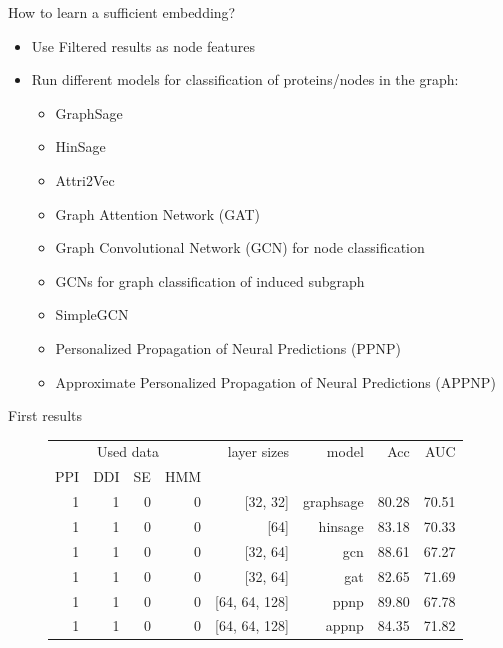 \documentclass[10pt]{beamer}
\begin{document}
\begin{frame}{How to learn a sufficient embedding?}
	\begin{itemize}
		\item Use Filtered results as node features
		\item Run different models for classification of proteins/nodes in the graph:
		\begin{itemize}
			\item GraphSage
			\item HinSage
			\item Attri2Vec
			\item Graph Attention Network (GAT)
			\item Graph Convolutional Network (GCN) for node classification
			\item GCNs for graph classification of induced subgraph
			\item SimpleGCN
			\item Personalized Propagation of Neural Predictions (PPNP)
			\item Approximate Personalized Propagation of Neural Predictions (APPNP)
		\end{itemize}
	\end{itemize}
	
\end{frame}

\begin{frame}{First results}
	\begin{figure}
		\centering
		\begingroup
		
		\footnotesize
		\def\arraystretch{1.2}
		\begin{tabular}{|r|r|r|r|r|r|r|r|}
			\hline
			\multicolumn{4}{|c|}{Used data}&layer sizes&model&Acc&AUC\\
			PPI&DDI&SE&HMM&&&&\\
			\hline
			1&1&0&0&[32, 32]&graphsage&80.28&70.51\\
			1&1&0&0&[64]&hinsage&83.18&70.33\\
			1&1&0&0&[32, 64]&gcn&88.61&67.27\\
			1&1&0&0&[32, 64]&gat&82.65&71.69\\
			1&1&0&0&[64, 64, 128]&ppnp&89.80&67.78\\
			1&1&0&0&[64, 64, 128]&appnp&84.35&71.82\\
			
			\hline  
		\end{tabular}
		\endgroup
	\end{figure}
\end{frame}
\end{document}
